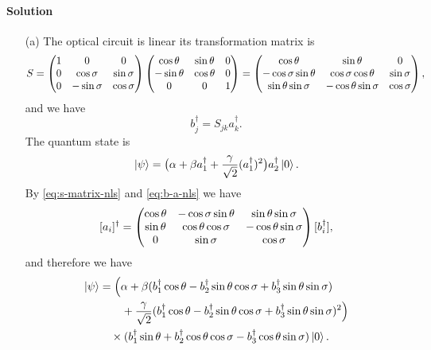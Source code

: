 \documentclass[hyperref, a4paper]{article}
\begin{document}
\paragraph{Solution} \begin{itemize}
    \item[(a)] The optical circuit is linear its transformation matrix is 
    \begin{equation}
        S = \pmqty{ 1 & 0 & 0 \\ 0 & \cos \sigma & \sin \sigma \\ 0 & - \sin \sigma & \cos \sigma } \pmqty{ \cos \theta & \sin \theta & 0 \\ - \sin \theta & \cos \theta & 0 \\ 0 & 0 & 1  } = \pmqty{ \cos \theta & \sin \theta & 0 \\ - \cos \sigma \sin \theta & \cos \sigma \cos \theta & \sin \sigma \\ \sin \theta \sin \sigma & - \cos \theta \sin \sigma & \cos \sigma },
        \label{eq:s-matrix-nls}
    \end{equation} 
    and we have 
    \begin{equation}
        b^\dagger_j = S_{jk} a^\dagger_k.
        \label{eq:b-a-nls}
    \end{equation}
    The quantum state is 
    \[
        \ket*{\psi} = \big( \alpha + \beta a_1^\dagger + \frac{\gamma}{\sqrt{2}} (a_1^\dagger)^2 \big) a_2^\dagger \ket*{0} .
    \]
    By \eqref{eq:s-matrix-nls} and \eqref{eq:b-a-nls} we have 
    \[
        [a_i]^\dagger = \pmqty{\cos \theta  & -\cos \sigma  \sin \theta  & \sin \theta  \sin \sigma  \\
        \sin \theta  & \cos \theta  \cos \sigma  & -\cos \theta  \sin \sigma  \\
        0 & \sin \sigma  & \cos \sigma  } [b_i^\dagger],
    \]
    and therefore we have 
    \begin{equation}
        \begin{aligned}
            \ket*{\psi} &= \Big( \alpha + \beta ( b_1^\dagger \cos \theta - b_2^\dagger \sin \theta  \cos \sigma + b_3^\dagger \sin \theta  \sin \sigma ) \\
            &\quad \quad + \frac{\gamma}{\sqrt{2}} ( b_1^\dagger \cos \theta - b_2^\dagger \sin \theta  \cos \sigma + b_3^\dagger \sin \theta  \sin \sigma )^2 \Big) \\
            &\quad \times   (b_1^\dagger \sin \theta +b_2^\dagger \cos \theta  \cos \sigma -b_3^\dagger \cos \theta  \sin \sigma ) \ket*{0}.
        \end{aligned}

\end{equation}
\end{itemize}
\end{document}
